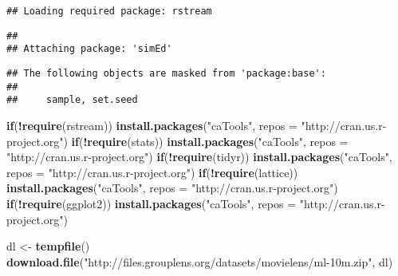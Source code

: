 \documentclass[]{article}
\newenvironment{Shaded}{\begin{snugshade}}{\end{snugshade}}
\newcommand{\KeywordTok}[1]{\textcolor[rgb]{0.13,0.29,0.53}{\textbf{#1}}}
\newcommand{\DataTypeTok}[1]{\textcolor[rgb]{0.13,0.29,0.53}{#1}}
\newcommand{\StringTok}[1]{\textcolor[rgb]{0.31,0.60,0.02}{#1}}
\newcommand{\ControlFlowTok}[1]{\textcolor[rgb]{0.13,0.29,0.53}{\textbf{#1}}}
\newcommand{\OperatorTok}[1]{\textcolor[rgb]{0.81,0.36,0.00}{\textbf{#1}}}
\newcommand{\NormalTok}[1]{#1}
\begin{document}
\begin{verbatim}
## Loading required package: rstream
\end{verbatim}

\begin{verbatim}
## 
## Attaching package: 'simEd'
\end{verbatim}

\begin{verbatim}
## The following objects are masked from 'package:base':
## 
##     sample, set.seed
\end{verbatim}

\begin{Shaded}
\begin{Highlighting}[]
\ControlFlowTok{if}\NormalTok{(}\OperatorTok{!}\KeywordTok{require}\NormalTok{(rstream)) }\KeywordTok{install.packages}\NormalTok{(}\StringTok{"caTools"}\NormalTok{, }\DataTypeTok{repos =} \StringTok{"http://cran.us.r-project.org"}\NormalTok{)}
\ControlFlowTok{if}\NormalTok{(}\OperatorTok{!}\KeywordTok{require}\NormalTok{(stats)) }\KeywordTok{install.packages}\NormalTok{(}\StringTok{"caTools"}\NormalTok{, }\DataTypeTok{repos =} \StringTok{"http://cran.us.r-project.org"}\NormalTok{)}
\ControlFlowTok{if}\NormalTok{(}\OperatorTok{!}\KeywordTok{require}\NormalTok{(tidyr)) }\KeywordTok{install.packages}\NormalTok{(}\StringTok{"caTools"}\NormalTok{, }\DataTypeTok{repos =} \StringTok{"http://cran.us.r-project.org"}\NormalTok{)}
\ControlFlowTok{if}\NormalTok{(}\OperatorTok{!}\KeywordTok{require}\NormalTok{(lattice)) }\KeywordTok{install.packages}\NormalTok{(}\StringTok{"caTools"}\NormalTok{, }\DataTypeTok{repos =} \StringTok{"http://cran.us.r-project.org"}\NormalTok{)}
\ControlFlowTok{if}\NormalTok{(}\OperatorTok{!}\KeywordTok{require}\NormalTok{(ggplot2)) }\KeywordTok{install.packages}\NormalTok{(}\StringTok{"caTools"}\NormalTok{, }\DataTypeTok{repos =} \StringTok{"http://cran.us.r-project.org"}\NormalTok{)}
\end{Highlighting}
\end{Shaded}

\begin{Shaded}
\begin{Highlighting}[]
\NormalTok{dl <-}\StringTok{ }\KeywordTok{tempfile}\NormalTok{()}
\KeywordTok{download.file}\NormalTok{(}\StringTok{"http://files.grouplens.org/datasets/movielens/ml-10m.zip"}\NormalTok{, dl)}
\end{Highlighting}
\end{Shaded}
\end{document}
